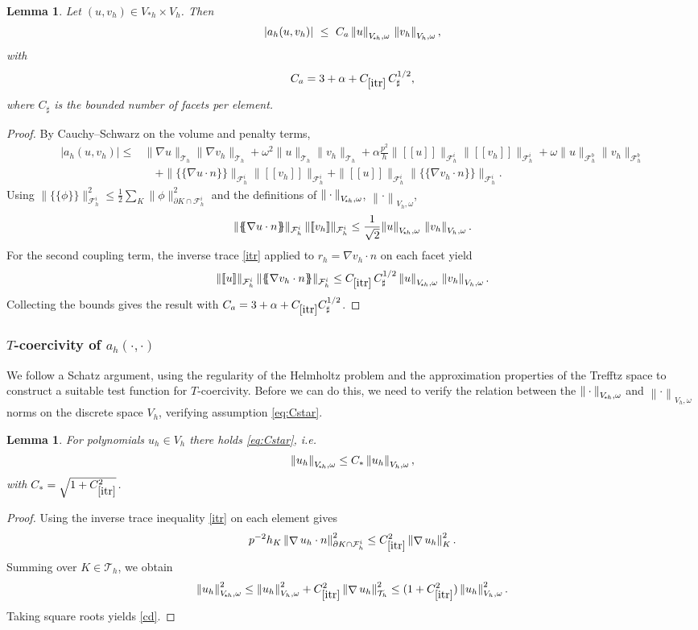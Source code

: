 \documentclass[11pt]{article}
\theoremstyle{definition}
\theoremstyle{plain}
\newtheorem{lemma}[theorem]{Lemma}
\newcommand{\Ca}{C_a}
\newcommand{\CD}{C_*}
\newcommand{\const}[1]{C_{\eqref{#1}}}
\newcommand{\Vsh}{V_{\!\star \hspace*{-0.2mm}h}}
\newcommand{\dgonorm}[1]{\norm{#1}_{V_h,\omega}}
\newcommand{\tdgonorm}[1]{{\Vert#1\Vert}_{\Vsh,\omega}}
\newcommand{\jmp}[1]{[\![ #1 ]\!]}
\newcommand{\avg}[1]{\{\!\!\{#1\}\!\!\}}
\newcommand{\Th}{{\calT_h}}
\newcommand{\Fhi}{{\calF_h^i}}
\newcommand{\Fhb}{{\calF_h^b}}
\DeclareMathOperator{\grad}{\nabla}
\newcommand*{\norm}[1]{\left\|#1\right\|}
\newcommand{\calF}{\mathcal{F}}
\newcommand{\calT}{\mathcal{T}}
\begin{document}
\begin{lemma}\label{lem:ah_continuity}
Let $(u,v_h)\in V_{*h}\times V_h$. Then
\[
|a_h(u,v_h)|\ \le\ \Ca\,\tdgonorm{u}\,\dgonorm{v_h},
\]
with
\[
\Ca = 3+\alpha+\const{itr}\,C_\sharp^{1/2},
\]
where $C_\sharp$ is the bounded number of facets per element.
\end{lemma}

\begin{proof}
By Cauchy--Schwarz on the volume and penalty terms,
\begin{align*}
|a_h(u,v_h)|
\le&
\|\nabla u\|_\Th\|\nabla v_h\|_\Th
+\omega^2\|u\|_\Th\|v_h\|_\Th
+\alpha\frac{p^2}{h}\|\jmp{u}\|_{\Fhi}\|\jmp{v_h}\|_{\Fhi}
+\omega\|u\|_{\Fhb}\|v_h\|_{\Fhb}
\\
&\quad
+\|\avg{\nabla u\cdot n}\|_{\Fhi}\|\jmp{v_h}\|_{\Fhi}
+\|\jmp{u}\|_{\Fhi}\|\avg{\nabla v_h\cdot n}\|_{\Fhi}.
\end{align*}
Using $\|\avg{\phi}\|_{\Fhi}^2\le \frac12\sum_{K}\|\phi\|_{\partial K\cap\Fhi}^2$ and the definitions of
$\tdgonorm{\cdot}$, $\dgonorm{\cdot}$,
\[
\|\avg{\nabla u\cdot n}\|_{\Fhi}\,\|\jmp{v_h}\|_{\Fhi}
\le \frac1{\sqrt2}\tdgonorm{u}\,\dgonorm{v_h}.
\]
For the second coupling term, the inverse trace \eqref{itr} applied to $r_h=\nabla v_h\cdot n$ on each facet yield
\[
\|\jmp{u}\|_{\Fhi}\,\|\avg{\nabla v_h\cdot n}\|_{\Fhi}
\le \const{itr}\,C_\sharp^{1/2}\,\tdgonorm{u}\,\dgonorm{v_h}.
\]
Collecting the bounds gives the result with $\Ca=3+\alpha+\const{itr}C_\sharp^{1/2}$.
\end{proof}



\subsubsection{\texorpdfstring{$T$-coercivity of $a_h(\cdot,\cdot)$}{T-coercivity of ah}}\label{sec:ah_coerc}
We follow a Schatz argument, using the regularity of the Helmholtz problem and the approximation properties of the Trefftz space to construct a suitable test function for $T$-coercivity.
Before we can do this, we need to verify the relation between the $\tdgonorm{\cdot}$ and $\dgonorm{\cdot}$ norms on the discrete space $V_h$, verifying assumption \eqref{eq:Cstar}.

\begin{lemma}
For polynomials $u_h\in V_h$ there holds \eqref{eq:Cstar}, i.e.
\begin{equation}\label{cd}
    \tdgonorm{u_h} \leq \CD \dgonorm{u_h},
\end{equation}
with $\CD = \sqrt{1 + \const{itr}^2}$.
\end{lemma}
\begin{proof}
Using the inverse trace inequality \eqref{itr} on each element gives
\[
p^{-2} h_K \norm{\grad u_h \cdot n}_{\partial K\cap\Fhi}^2
\le \const{itr}^2 \norm{\grad u_h}_{K}^2 .
\]
Summing over $K\in\Th$, we obtain
\[
\tdgonorm{u_h}^2
\le
\dgonorm{u_h}^2 + \const{itr}^2 \norm{\grad u_h}_{\Th}^2
\le
(1+\const{itr}^2)\dgonorm{u_h}^2 .
\]
Taking square roots yields \eqref{cd}.
\end{proof}
\end{document}
